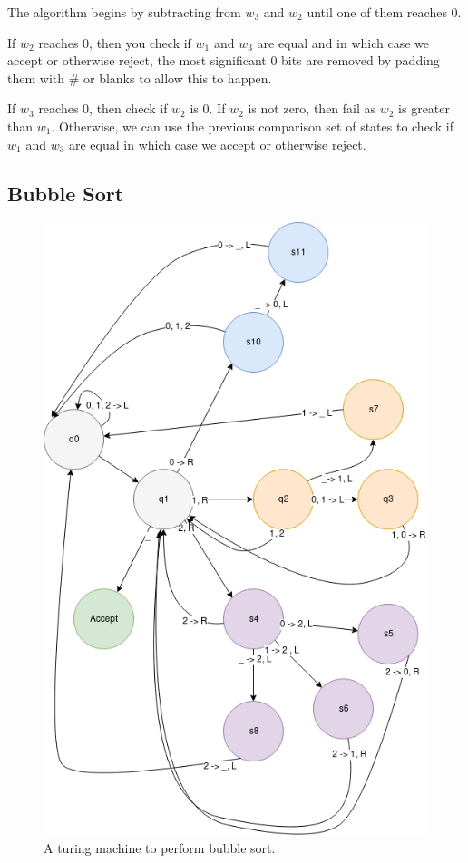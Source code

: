 \documentclass{article}
\begin{document}
The algorithm begins by subtracting from $w_3$ and $w_2$ until one of them reaches 0.

If $w_2$ reaches 0, then you check if $w_1$ and $w_3$ are equal and in which case we accept or otherwise reject, the most significant 0 bits are removed by padding them with $\#$ or blanks to allow this to happen.

If $w_3$ reaches 0, then check if $w_2$ is 0. If $w_2$ is not zero, then fail as $w_2$ is greater than $w_1$. Otherwise, we can use the previous comparison set of states to check if $w_1$ and $w_3$ are equal in which case we accept or otherwise reject.

\newpage

\subsection{Bubble Sort}

\begin{figure}[!htb]
  \caption{A turing machine to perform bubble sort.}
  \centering
  \includegraphics[scale=0.30]{images/bubble.png}
\end{figure}
\end{document}
